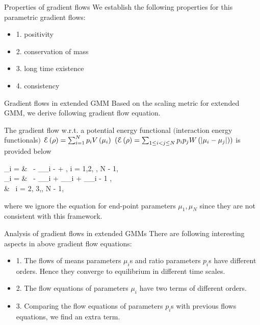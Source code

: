 \documentclass{beamer}
\begin{document}
\begin{frame}{Properties of gradient flows}	
	We establish the following properties for this parametric gradient flows:
	\begin{itemize}
		\item 1. positivity
		\item 2. conservation of mass
		\item 3. long time existence
		\item 4. consistency
	\end{itemize}
\end{frame}

\begin{frame}{Gradient flows in extended GMM}	
	Based on the scaling metric for extended GMM, we derive following gradient flow equation.
	\small
	\begin{Thm}\label{ext-general-thm}
	The gradient flow w.r.t. a potential energy functional $($interaction energy functionals$)$ $\mathcal{E}\left( \rho \right) = \sum_{i = 1}^N p_i V\left( \mu_i \right)$ $(\mathcal{E}\left( \rho \right) = \sum_{1 \leq i < j \leq N} p_i p_j W\left( \left| \mu_i - \mu_j \right| \right))$ is provided below
	\tiny
	\bequn\label{ext-general}
		\begin{aligned}
			\dot{\theta}_i = & \ - \lp \p_{\theta_i} \mcE\lp \rho \rp - \lp  {} +  \rp \rp, \quad i = 1,2, \cdots, N - 1,	\\
			\dot{\mu}_i = & \ - \p_{\mu_i} \mcE\lp \rho \rp + \lp {}\p_{\theta_i} \mcE\lp \rho \rp + \p_{\theta_{i - 1}} \mcE\lp \rho \rp \rp, \\
			& \ \quad i = 2, 3,\cdots, N - 1,
		\end{aligned}
	\eequn
	\small
	where we ignore the equation for end-point parameters $\mu_1, \mu_N$ since they are not consistent with this framework.
\end{Thm}
	
\end{frame}

\begin{frame}{Analysis of gradient flows in extended GMMs}
	There are following interesting aspects in above gradient flow equations:
	\begin{itemize}
		\item 1. The flows of means parameters $\mu_i$s and ratio parameters $p_i$s have different orders. Hence they converge to equilibrium in different time scales.
		\item 2. The flow equations of parameters $\mu_i$ have two terms of different orders.
		\item 3. Comparing the flow equations of parameters $p_i$s with previous flows equations, we find an extra term.
	\end{itemize}
\end{frame}
\end{document}
